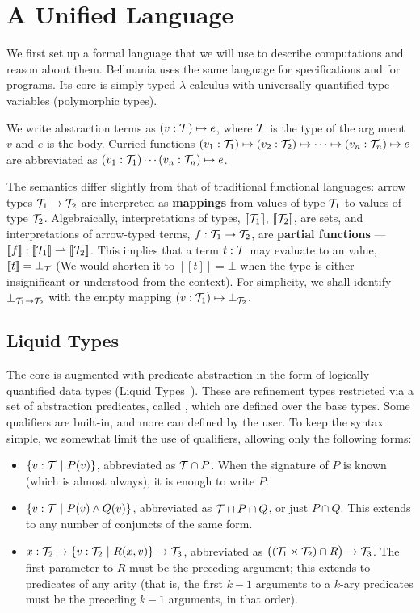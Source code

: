 \section{A Unified Language}

\newcommand\semp[1]{[\![{#1}]\!]}
\newcommand\fix{\operatorname{fix}}

We first set up a formal language that we will use to describe computations and reason about them.
Bellmania uses the same language for specifications and for programs.  Its core is simply-typed
$\lambda$-calculus with universally quantified type variables (polymorphic types).

We write abstraction terms as $(v:\mathcal{T})\mapsto e$, where $\mathcal{T}$ is the type of the argument $v$ and $e$ is
the body. Curried functions $(v_1:\mathcal{T}_1)\mapsto (v_2:\mathcal{T}_2) \mapsto \cdots \mapsto (v_n:\mathcal{T}_n) \mapsto e$ are abbreviated 
as $(v_1:\mathcal{T}_1)\cdots(v_n:\mathcal{T}_n)\mapsto e$.

The semantics differ slightly from that of traditional functional languages: arrow types $\mathcal{T}_1\to\mathcal{T}_2$
are interpreted as {\bf mappings} from values of type $\mathcal{T}_1$ to values of type $\mathcal{T}_2$. Algebraically,
interpretations of types, $\semp{\T_1}$, $\semp{\T_2}$, are sets, and interpretations of arrow-typed terms,
$f : \mathcal{T}_1\to\mathcal{T}_2$, are {\bf partial functions} --- $\semp{f} : \semp{\T_1}\rightharpoonup\semp{\T_2}$.
This implies that a term $t : \mathcal{T}$ may evaluate to an  value, $\semp{t}=\bot_\T$
(We would shorten it to $\semp{t}=\bot$ when the type is either insignificant or understood from the context).
For simplicity, we shall identify $\bot_{\mathcal{T}_1\to\mathcal{T}_2}$ with the empty mapping $(v:\mathcal{T}_1)\mapsto\bot_{\mathcal{T}_2}$.

\subsection{Liquid Types}

The core is augmented with predicate abstraction in the form of logically quantified data types 
(Liquid Types~\cite{PLDI08/Rondon}). These are refinement types restricted via a set of abstraction predicates,
called , which are defined over the base types.
Some qualifiers are built-in, and more can defined by the user. To keep the syntax simple, we somewhat
limit the use of qualifiers, allowing only the following forms:

\begin{itemize}
  \item $\{v:\mathcal{T} ~|~ P(v)\}$, abbreviated as $\mathcal{T}\cap P$. When the signature of $P$ is known (which is
  almost always), it is enough to write $P$.
  \item $\{v:\mathcal{T} ~|~ P(v)\land Q(v)\}$, abbreviated as $\mathcal{T}\cap P\cap Q$, or just $P\cap Q$. This extends
  to any number of conjuncts of the same form.
  \item $x : \mathcal{T}_2 \to \{v:\mathcal{T}_2 ~|~ R(x,v)\} \to \mathcal{T}_3$, abbreviated as $\big((\mathcal{T}_1\times\mathcal{T}_2)\cap R\big)\to\mathcal{T}_3$.
  The first parameter to $R$ must be the preceding argument; this extends to predicates of
  any arity (that is, the first $k-1$ arguments to a $k$-ary predicates must be the preceding $k-1$
  arguments, in that order).
\end{itemize}

